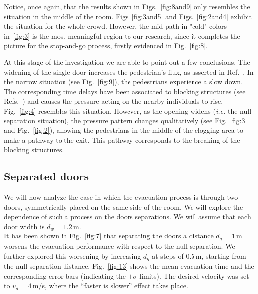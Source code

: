 {\color{red} Notice, once again, that the results shown in Figs.~\ref{fig:8and9} only resembles the 
situation in the middle of the room. Figs~\ref{fig:3and5} and Figs.~\ref{fig:2and4} exhibit 
the situation for the whole crowd. However, the mid path in "cold" colors in~\ref{fig:3} is
the most meaningful region to our research, since it completes the picture
for the stop-and-go process, firstly evidenced in Fig.~\ref{fig:8}.
}



At this stage of the investigation we are able to point out a few conclusions. 
The widening of the single door increases the pedestrian's flux, as asserted in 
Ref.~\cite{daoliang1}. In the narrow situation (see Fig.~\ref{fig:9}), 
the pedestrians experience a slow down. The corresponding time delays have been 
associated to blocking structures (see Refs.~\cite{Dorso1,Dorso2}) and causes 
the pressure acting on the nearby individuals to rise. Fig.~\ref{fig:4} 
resembles this situation. However, as the opening widens (\emph{i.e.} the null 
separation situation), the pressure pattern changes qualitatively (see 
Fig.~\ref{fig:3} and Fig.~\ref{fig:2}), allowing the pedestrians in the middle 
of the clogging area to make a pathway to the exit. This pathway corresponds to 
the breaking of the blocking structures.   \\

\subsection{\label{door_seperation} Separated doors}

We will now analyze the case in which the evacuation process is through two 
doors, symmetrically placed on the same side of the room. We will explore the 
dependence of such a process on the doors separations. We will assume that 
each door width is $d_w=1.2\,$m.  \\

It has been shown in Fig.~\ref{fig:7} that separating the doors a distance 
$d_g=1\,$m worsens the evacuation performance with respect to the null 
separation. We  further explored this worsening by increasing $d_g$ at steps of 
$0.5\,$m, starting from the null separation distance. Fig.~\ref{fig:13} shows 
the mean evacuation time and the corresponding error bars (indicating the 
$\pm\sigma$ limits). The desired velocity was set to $v_d=4\,$m/s, where the 
``faster is slower'' effect takes place. \\

